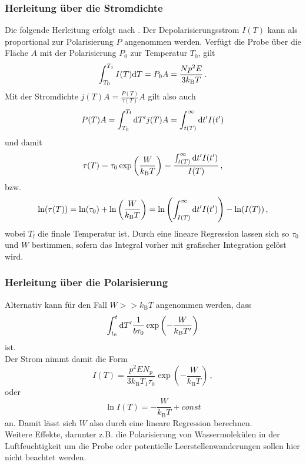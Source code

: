\subsubsection{Herleitung über die Stromdichte}

Die folgende Herleitung erfolgt nach \cite[S. ~4]{fuller}. Der Depolarisierungsstrom $I(T)$ kann als proportional zur Polarisierung $P$ angenommen werden.
Verfügt die Probe über die Fläche $A$ mit der Polarisierung $P_0$ zur Temperatur $T_0$, gilt
\begin{equation*}
    \int^{T_1}_{T_0} I(T) \mathrm{d} T = P_0 A = \frac{N p^2 E}{3 k_\text{B}T} \,.
\end{equation*}
Mit der Stromdichte $j(T) A = \frac{P(T)}{\tau(T)} A$ gilt also auch
\begin{equation*}
    P(T) A = \int^{T_\text{f}}_{T_0} \mathrm{d} T' j(T) A  = \int^\infty_{t(T)} \mathrm{d} t' I(t')
\end{equation*}
und damit
\begin{equation}
    \tau(T) = \tau_0 \exp \left(\frac{W}{k_\text{B} T} \right) =  \frac{\int^\infty_{t(T)} \mathrm{d} t' I(t')}{I(T)} \,,
    \label{eq:relaxozeitpol}
\end{equation}
bzw.
\begin{equation}
    \ln(\tau(T)) = \ln(\tau_0) + \ln\left(\frac{W}{k_\text{B} T} \right) =  \ln \left(\int^\infty_{I(T)} \mathrm{d} t' I(t') \right) - \ln (I(T)) \,,
    \label{eq:lnrelaxozeitpol}
\end{equation}
wobei $T_\text{f}$ die finale Temperatur ist.
Durch eine lineare Regression lassen sich so $\tau_0$ und $W$ bestimmen, sofern das Integral vorher mit grafischer Integration gelöst wird.

\subsubsection{Herleitung über die Polarisierung}

Alternativ kann für den Fall $W >> k_\text{B} T$ angenommen werden, dass
\begin{equation*}
    \int^t_{t_0} \mathrm{d} T' \frac{1}{b \tau_0}  \exp \left(-\frac{W}{k_\text{B} T'} \right)
\end{equation*}
ist. \\
Der Strom nimmt damit die Form
\begin{equation*}
    I(T) = \frac{p^2 E N_\text{p}}{3 k_\text{B} T_1 \tau_0} \exp(-\frac{W}{k_\text{B} T}) \, ,
\end{equation*}
oder
\begin{equation}
    \ln I(T) = - \frac{W}{k_\text{B} T} + const
    \label{eq:lnStrom}
\end{equation}
an.
Damit lässt sich $W$ also durch eine lineare Regression berechnen. \\

Weitere Effekte, darunter z.B. die Polarisierung von Wassermolekülen in der Luftfeuchtigkeit um die Probe oder potentielle Leerstellenwanderungen sollen hier nicht beachtet werden.



